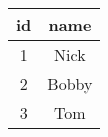 \documentclass{article}
\begin{document}
\begin{center}
\begin{tabular}{|c|c|}
	\hline
	id & name \\
	\hline
	1 & Nick \\
	\hline
	2 & Bobby \\
	\hline
	3 & Tom \\
	\hline
\end{tabular}
\end{center}
\end{document}
